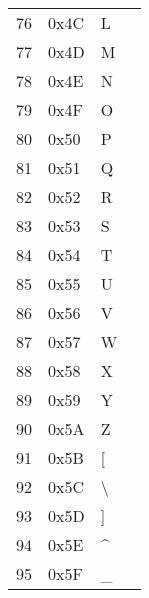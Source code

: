 \documentclass[11pt,fleqn]{book} %
\begin{document}
\begin{table}[]
\begin{tabular}{|l|l|l|l|}
76            & 0x4C      & L          & \\
77            & 0x4D      & M          & \\
78            & 0x4E      & N          & \\
79            & 0x4F      & O          & \\
80            & 0x50      & P          & \\
81            & 0x51      & Q          & \\
82            & 0x52      & R          & \\
83            & 0x53      & S          & \\
84            & 0x54      & T          & \\
85            & 0x55      & U          & \\
86            & 0x56      & V          & \\
87            & 0x57      & W          & \\
88            & 0x58      & X          & \\
89            & 0x59      & Y          & \\
90            & 0x5A      & Z          & \\
91            & 0x5B      & [          & \\
92            & 0x5C      & \textbackslash          & \\
93            & 0x5D      & ]          & \\
94            & 0x5E      & \^{}          & \\
95            & 0x5F      & \_          & \\


\hline
\end{tabular}
\end{table}
\end{document}
